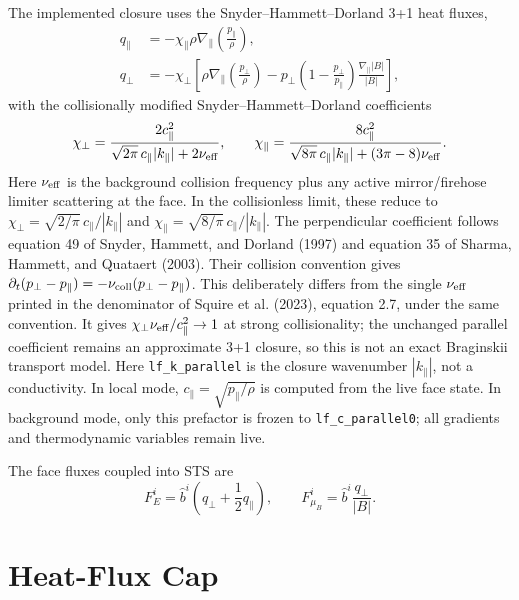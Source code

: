\documentclass[11pt]{article}
\begin{document}
The implemented closure uses the Snyder--Hammett--Dorland 3+1 heat fluxes,
\begin{align}
  q_\parallel &=
    -\chi_\parallel \rho \nabla_\parallel\left(\frac{p_\parallel}{\rho}\right),
  \\
  q_\perp &=
    -\chi_\perp \left[
      \rho \nabla_\parallel\left(\frac{p_\perp}{\rho}\right)
      - p_\perp\left(1-\frac{p_\perp}{p_\parallel}\right)
        \frac{\nabla_\parallel |B|}{|B|}
    \right],
\end{align}
with the collisionally modified Snyder--Hammett--Dorland coefficients
\begin{equation}
  \chi_\perp =
    \frac{2c_\parallel^2}
      {\sqrt{2\pi}\,c_\parallel |k_\parallel| + 2\nu_{\rm eff}},
  \qquad
  \chi_\parallel =
    \frac{8c_\parallel^2}
      {\sqrt{8\pi}\,c_\parallel |k_\parallel|
        + (3\pi-8)\nu_{\rm eff}} .
\end{equation}
Here \(\nu_{\rm eff}\) is the background collision frequency plus any active
mirror/firehose limiter scattering at the face.  In the collisionless limit,
these reduce to
\(\chi_\perp=\sqrt{2/\pi}\,c_\parallel/|k_\parallel|\) and
\(\chi_\parallel=\sqrt{8/\pi}\,c_\parallel/|k_\parallel|\).
The perpendicular coefficient follows equation 49 of
Snyder, Hammett, and Dorland (1997) and equation 35 of
Sharma, Hammett, and Quataert (2003)\cite{Snyder1997,Sharma2003}.
Their collision convention gives
\(\partial_t(p_\perp-p_\parallel)=-\nu_{\rm coll}(p_\perp-p_\parallel)\).
This deliberately differs from the single \(\nu_{\rm eff}\) printed in the
denominator of Squire et al. (2023), equation 2.7, under the same convention.
It gives \(\chi_\perp\nu_{\rm eff}/c_\parallel^2\to1\) at strong collisionality;
the unchanged parallel coefficient remains an approximate 3+1 closure, so
this is not an exact Braginskii transport model.
Here \texttt{lf\_k\_parallel} is the closure wavenumber \(|k_\parallel|\), not a
conductivity.  In local mode, \(c_\parallel=\sqrt{p_\parallel/\rho}\) is computed
from the live face state.  In background mode, only this prefactor is frozen to
\texttt{lf\_c\_parallel0}; all gradients and thermodynamic variables remain live.

The face fluxes coupled into STS are
\begin{equation}
  F_E^i = \hat{b}^i \left(q_\perp + \frac{1}{2}q_\parallel\right),
  \qquad
  F_{\mu_B}^i = \hat{b}^i \frac{q_\perp}{|B|}.
\end{equation}

\section{Heat-Flux Cap}
\end{document}
